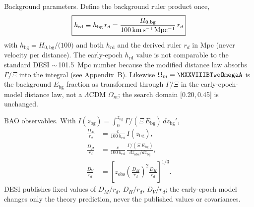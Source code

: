 Background parameters. Define the background ruler product once,
\begin{equation}
  \boxed{%
    h_{\mathrm{rd}} \equiv h_{\mathrm{bg}}\,r_{d}
    = \frac{H_{0,\mathrm{bg}}}{100\,\mathrm{km\,s^{-1}\,Mpc^{-1}}}\,r_{d}%
  }
  \label{eq:hrd}
\end{equation}
with $h_{\mathrm{bg}}=H_{0,\mathrm{bg}}/(100$\kmsMpc{}$)$ and both
$h_{\mathrm{rd}}$ and the derived ruler $r_{d}$ in Mpc
(never velocity per distance).
The early-epoch $h_{\mathrm{rd}}$ value is not comparable to the
standard DESI $\sim$\,101.5~Mpc number because the modified distance law
absorbs $\Gamma/\Xi$ into the integral (see Appendix~B).
Likewise $\Omega_{m}=\MXXVIIIBTwoOmegaA$ is the background $E_{\mathrm{bg}}$
fraction as transformed through $\Gamma/\Xi$ in the early-epoch-model distance law,
not a $\Lambda$CDM $\Omega_{m}$; the search domain [0.20,\,0.45] is unchanged.

BAO observables. With
$I(z_{\mathrm{bg}})=\int_{0}^{z_{\mathrm{bg}}}
\Gamma/(\Xi\,E_{\mathrm{bg}})\,dz_{\mathrm{bg}}'$,
\begin{align}
  \frac{D_{M}}{r_{d}}
    &= \frac{c}{100\,h_{\mathrm{rd}}}\,I(z_{\mathrm{bg}}),
  \label{eq:dm-rd} \\
  \frac{D_{H}}{r_{d}}
    &= \frac{c}{100\,h_{\mathrm{rd}}}\,
       \frac{\Gamma/(\Xi\,E_{\mathrm{bg}})}
            {dz_{\mathrm{obs}}/dz_{\mathrm{bg}}},
  \label{eq:dh-rd} \\
  \frac{D_{V}}{r_{d}}
    &= \left[z_{\mathrm{obs}}
       \left(\frac{D_{M}}{r_{d}}\right)^{2}
       \frac{D_{H}}{r_{d}}\right]^{1/3}.
  \label{eq:dv-rd}
\end{align}
DESI publishes fixed values of $D_{M}/r_{d}$, $D_{H}/r_{d}$,
$D_{V}/r_{d}$; the early-epoch model changes only the theory prediction, never the
published values or covariances.

